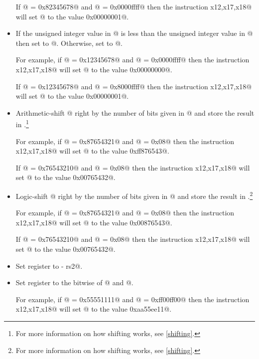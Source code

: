 \begin{itemize}
If @ = \verb@0x82345678@ and @ = \verb@0x0000ffff@
then the instruction \verb@slt x12,x17,x18@ will set @ to the
value \verb@0x00000001@.

\item{}
\label{insn:sltu}

If the unsigned integer value in @ is less than the
unsigned integer value in @ then set \verb@rd@ to @.
Otherwise, set \verb@rd@ to @.

For example, if @ = \verb@0x12345678@ and @ = \verb@0x0000ffff@
then the instruction \verb@sltu x12,x17,x18@ will set @ to the
value \verb@0x00000000@.

If @ = \verb@0x12345678@ and @ = \verb@0x8000ffff@
then the instruction \verb@sltu x12,x17,x18@ will set @ to the
value \verb@0x00000001@.

\item{}
\label{insn:sra}

Arithmetic-shift @ right by the number of bits given in @ and
store the result in \verb@rd@.\footnote{For
more information on how shifting works, see \autoref{shifting}.}

For example, if @ = \verb@0x87654321@ and @ = \verb@0x08@
then the instruction \verb@sra x12,x17,x18@ will set @ to the
value \verb@0xff876543@.

If @ = \verb@0x76543210@ and @ = \verb@0x08@
then the instruction \verb@sra x12,x17,x18@ will set @ to the
value \verb@0x00765432@.

\item{}
\label{insn:srl}

Logic-shift @ right by the number of bits given in @ and
store the result in \verb@rd@.\footnote{For
more information on how shifting works, see \autoref{shifting}.}

For example, if @ = \verb@0x87654321@ and @ = \verb@0x08@
then the instruction \verb@srl x12,x17,x18@ will set @ to the
value \verb@0x00876543@.

If @ = \verb@0x76543210@ and @ = \verb@0x08@
then the instruction \verb@srl x12,x17,x18@ will set @ to the
value \verb@0x00765432@.

\item{}
\label{insn:sub}

Set register \verb@rd@ to  - rs2@.

\item{}
\label{insn:xor}

Set register \verb@rd@ to the bitwise \verb@xor@ of @ and  @.

For example, if @ = \verb@0x55551111@ and @ = \verb@0xff00ff00@
then the instruction \verb@xor x12,x17,x18@ will set @ to the
value \verb@0xaa55ee11@.

\end{itemize}
